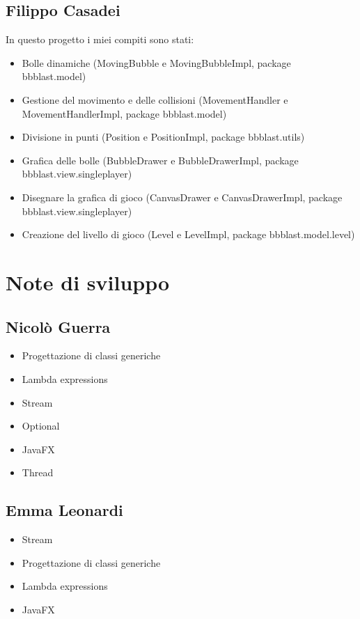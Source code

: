\documentclass[a4paper,12pt]{report}
\begin{document}
\subsection{Filippo Casadei}
In questo progetto i miei compiti sono stati:
\begin{itemize}
	\item Bolle dinamiche (MovingBubble e MovingBubbleImpl, package bbblast.model)
	\item Gestione del movimento e delle collisioni (MovementHandler e MovementHandlerImpl, package bbblast.model)
	\item Divisione in punti (Position e PositionImpl, package bbblast.utils)
	\item Grafica delle bolle (BubbleDrawer e BubbleDrawerImpl, package bbblast.view.singleplayer)
	\item Disegnare la grafica di gioco (CanvasDrawer e CanvasDrawerImpl, package bbblast.view.singleplayer)
	\item Creazione del livello di gioco (Level e LevelImpl, package bbblast.model.level)
\end{itemize}

\section{Note di sviluppo}

\subsection{Nicolò Guerra}
\begin{itemize}
	\item Progettazione di classi generiche
	\item Lambda expressions
	\item Stream
	\item Optional
	\item JavaFX
	\item Thread
\end{itemize}

\subsection{Emma Leonardi}
\begin{itemize}
	\item Stream
	\item Progettazione di classi generiche
	\item Lambda expressions
	\item JavaFX
\end{itemize}
\end{document}
